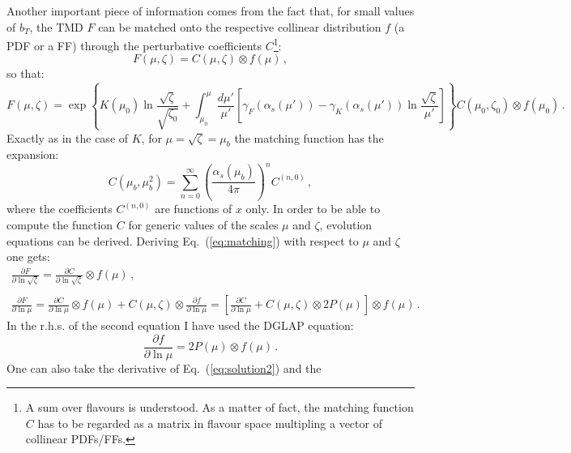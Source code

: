 \documentclass[10pt,a4paper]{article}
\begin{document}
Another important piece of information comes from the fact that, for
small values of $b_T$, the TMD $F$ can be matched onto the respective
collinear distribution $f$ (a PDF or a FF) through the perturbative
coefficients $C$\footnote{A sum over flavours is understood. As a
  matter of fact, the matching function $C$ has to be regarded as a
  matrix in flavour space multipling a vector of collinear PDFs/FFs.}:
\begin{equation}\label{eq:matching}
F(\mu,\zeta) = C(\mu,\zeta) \otimes f(\mu)\,,
\end{equation}
so that:
\begin{equation}\label{eq:solution3}
  F(\mu,\zeta) = \exp\left\{
    K(\mu_0)\ln\frac{\sqrt{\zeta}}{\sqrt{\zeta_0}}+\int_{\mu_0}^{\mu}\frac{d\mu'}{\mu'}\left[\gamma_F(\alpha_s(\mu'))
      -
      \gamma_K(\alpha_s(\mu'))\ln\frac{\sqrt{\zeta}}{\mu'}\right]\right\}C(\mu_0,\zeta_0)\otimes
  f(\mu_0)\,.
\end{equation}
Exactly as in the case of $K$, for $\mu=\sqrt{\zeta}=\mu_b$ the
matching function has the expansion:
\begin{equation}
C(\mu_b,\mu_b^2) =\sum_{n=0}^{\infty}\left(\frac{\alpha_s(\mu_b)}{4\pi}\right)^{n}C^{(n,0)}\,,
\end{equation}
where the coefficients $C^{(n,0)}$ are functions of $x$ only. In order
to be able to compute the function $C$ for generic values of the
scales $\mu$ and $\zeta$, evolution equations can be derived. Deriving
Eq.~(\ref{eq:matching}) with respect to $\mu$ and $\zeta$ one gets:
\begin{equation}\label{eq:derivs1}
\begin{array}{l}
\displaystyle \frac{\partial F}{\partial \ln\sqrt{\zeta}} =
  \frac{\partial C}{\partial \ln\sqrt{\zeta}}\otimes f(\mu)\,,\\
\\
\displaystyle \frac{\partial F}{\partial \ln\mu} = \frac{\partial
  C}{\partial \ln\mu}\otimes f(\mu) + C(\mu,\zeta) \otimes
  \frac{\partial f}{\partial \ln\mu} = \left[\frac{\partial
  C}{\partial \ln\mu}+C(\mu,\zeta) \otimes 2P(\mu) \right]\otimes f(\mu)\,.
\end{array}
\end{equation}
In the r.h.s. of the second equation I have used the DGLAP equation:
\begin{equation}
\frac{\partial f}{\partial \ln\mu} = 2P(\mu) \otimes f(\mu)\,.
\end{equation}
One can also take the derivative of Eq.~(\ref{eq:solution2}) and the
\end{document}

